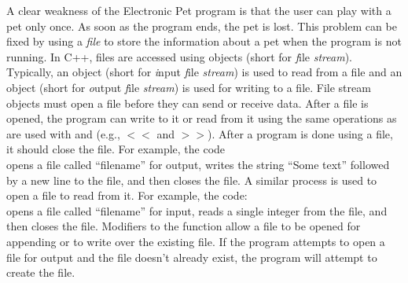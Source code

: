 A clear weakness of the Electronic Pet program is that the user can play with a pet only once.  As soon as the program ends, the pet is lost.  This problem can be fixed by using a \emph{file} to store the information about a pet when the program is not running.  In C++, files are accessed using  objects (short for \emph{f}ile \emph{stream}).  Typically, an  object (short for \emph{i}nput \emph{f}ile \emph{stream}) is used to read from a file and  an  object  (short for \emph{o}utput \emph{f}ile \emph{stream}) is used for writing to a file. 
File stream objects must open a file before they can send or receive data.  After a file is opened, the program can write to it or read from it using the same operations as are used with  and  (e.g., $<<$ and $>>$).  After a program is done using a file, it should close the file.  For example, the code\\
opens a file called ``filename'' for output, writes the string ``Some text'' followed by a new line to the file, and then closes the file.  A similar process is used to open a file to read from it.  For example, the code:\\  
opens a file called ``filename'' for input, reads a single integer from the file, and then closes the file.  
Modifiers to the  function allow a file to be opened for appending or to write over the existing file.  If the program attempts to open a file for output and the file doesn't already exist, the program will attempt to create the file.

